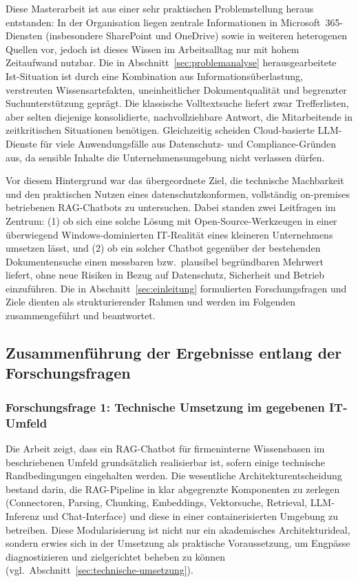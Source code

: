 Diese Masterarbeit ist aus einer sehr praktischen Problemstellung heraus entstanden: In der Organisation liegen zentrale Informationen in Microsoft~365-Diensten (insbesondere SharePoint und OneDrive) sowie in weiteren heterogenen Quellen vor, jedoch ist dieses Wissen im Arbeitsalltag nur mit hohem Zeitaufwand nutzbar.
Die in Abschnitt~\ref{sec:problemanalyse} herausgearbeitete Ist-Situation ist durch eine Kombination aus Informationsüberlastung, verstreuten Wissensartefakten, uneinheitlicher Dokumentqualität und begrenzter Suchunterstützung geprägt.
Die klassische Volltextsuche liefert zwar Trefferlisten, aber selten diejenige konsolidierte, nachvollziehbare Antwort, die Mitarbeitende in zeitkritischen Situationen benötigen.
Gleichzeitig scheiden Cloud-basierte LLM-Dienste für viele Anwendungsfälle aus Datenschutz- und Compliance-Gründen aus, da sensible Inhalte die Unternehmensumgebung nicht verlassen dürfen.

Vor diesem Hintergrund war das übergeordnete Ziel, die technische Machbarkeit und den praktischen Nutzen eines datenschutzkonformen, vollständig on-premises betriebenen RAG-Chatbots zu untersuchen.
Dabei standen zwei Leitfragen im Zentrum: (1) ob sich eine solche Lösung mit Open-Source-Werkzeugen in einer überwiegend Windows-dominierten IT-Realität eines kleineren Unternehmens umsetzen lässt, und (2) ob ein solcher Chatbot gegenüber der bestehenden Dokumentensuche einen messbaren bzw.\ plausibel begründbaren Mehrwert liefert, ohne neue Risiken in Bezug auf Datenschutz, Sicherheit und Betrieb einzuführen.
Die in Abschnitt~\ref{sec:einleitung} formulierten Forschungsfragen und Ziele dienten als strukturierender Rahmen und werden im Folgenden zusammengeführt und beantwortet.

\subsection{Zusammenführung der Ergebnisse entlang der Forschungsfragen}\label{subsec:zusammenfuhrung-der-ergebnisse-entlang-der-forschungsfragen}

\subsubsection{Forschungsfrage 1: Technische Umsetzung im gegebenen IT-Umfeld}

Die Arbeit zeigt, dass ein RAG-Chatbot für firmeninterne Wissensbasen im beschriebenen Umfeld grundsätzlich realisierbar ist, sofern einige technische Randbedingungen eingehalten werden.
Die wesentliche Architekturentscheidung bestand darin, die RAG-Pipeline in klar abgegrenzte Komponenten zu zerlegen (Connectoren, Parsing, Chunking, Embeddings, Vektorsuche, Retrieval, LLM-Inferenz und Chat-Interface) und diese in einer containerisierten Umgebung zu betreiben.
Diese Modularisierung ist nicht nur ein akademisches Architekturideal, sondern erwies sich in der Umsetzung als praktische Voraussetzung, um Engpässe diagnostizieren und zielgerichtet beheben zu können (vgl.\ Abschnitt~\ref{sec:technische-umsetzung}).

